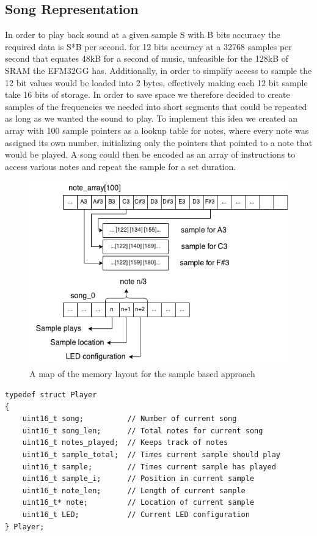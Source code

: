\subsection{Song Representation}
In order to play back sound at a given sample S with B bits accuracy the required data is S*B per second. for 12 bits accuracy at a 32768 samples per second that equates 48kB for a second of music, unfeasible for the 128kB of SRAM the EFM32GG has. Additionally, in order to simplify access to sample the 12 bit values would be loaded into 2 bytes, effectively making each 12 bit sample take 16 bits of storage. In order to save space we therefore decided to create samples of the frequencies we needed into short segments that could be repeated as long as we wanted the sound to play. To implement this idea we created an array with 100 sample pointers as a lookup table for notes, where every note was assigned its own number, initializing only the pointers that pointed to a note that would be played. A song could then be encoded as an array of instructions to access various notes and repeat the sample for a set duration.


\begin{figure}[ht]
  \centering
  \includegraphics[width=\textwidth]{images/sample_array_layout.png}
  \caption{A map of the memory layout for the sample based approach}\label{fig:array_layout}
\end{figure}

\begin{minipage}{\textwidth}
\begin{lstlisting}
typedef struct Player
{
	uint16_t song;			// Number of current song
	uint16_t song_len;		// Total notes for current song
	uint16_t notes_played;	// Keeps track of notes
	uint16_t sample_total;	// Times current sample should play	
	uint16_t sample;		// Times current sample has played
	uint16_t sample_i;		// Position in current sample 
	uint16_t note_len;		// Length of current sample
	uint16_t* note;			// Location of current sample
	uint16_t LED;			// Current LED configuration
} Player;
\end{lstlisting}
\end{minipage}

